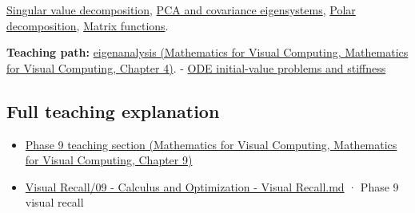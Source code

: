 \hyperref[appendix-1fad5e7f36fa]{Singular value decomposition}, \hyperref[appendix-ad175ef3c5bf]{PCA and covariance eigensystems}, \hyperref[appendix-73f5bcf7a462]{Polar decomposition}, \hyperref[appendix-0f4bc2bf2b1f]{Matrix functions}.

\textbf{Teaching path:} \href{../02-Mathematics-for-Visual-Computing/main.pdf\#nameddest=01-foundations-i-ch020-eigenvectors-reveal-the-directions-a-square-map-does-not-turn}{eigenanalysis (Mathematics for Visual Computing, Mathematics for Visual Computing, Chapter 4)}. - \hyperref[appendix-e8ab9836882e]{ODE initial-value problems and stiffness}

\subsection{Full teaching explanation}\label{appendix-0b3be18411f9-full-teaching-explanation}

\begin{itemize}
\tightlist
\item
  \href{../02-Mathematics-for-Visual-Computing/main.pdf\#nameddest=02-foundations-ii-ch025-odes-and-numerical-simulation}{Phase 9 teaching section (Mathematics for Visual Computing, Mathematics for Visual Computing, Chapter 9)}
\item
  \hyperref[appendix-adf48f5dc5c1]{Visual Recall/09 - Calculus and Optimization - Visual Recall.md} · Phase 9 visual recall
\end{itemize}
